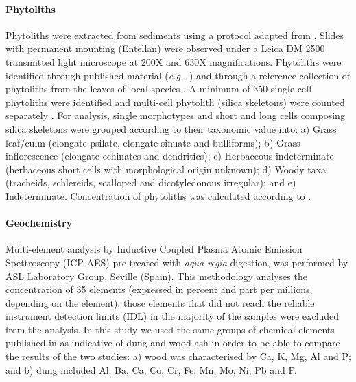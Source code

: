 \documentclass[authoryear,preprint,review,12pt]{elsarticle}
\begin{document}
\paragraph{Phytoliths}
Phytoliths were extracted from sediments using a protocol adapted from \citet{Madella1998}. Slides with permanent mounting (Entellan\textregistered) were observed under a Leica DM 2500 transmitted light microscope at 200X and 630X magnifications. Phytoliths were identified through published material (\emph{e.g.}, \citealp{Pearsall2008a,Piperno2006}) and through a reference collection of phytoliths from the leaves of local species \citep{Lancelotti2010}. A minimum of 350 single-cell phytoliths were identified and multi-cell phytolith (silica skeletons) were counted separately \citep{Veen1982,Zurro2010}. For analysis, single morphotypes and short and long cells composing silica skeletons were grouped according to their taxonomic value into: a) Grass leaf/culm (elongate psilate, elongate sinuate and bulliforms); b) Grass inflorescence (elongate echinates and dendritics); c) Herbaceous indeterminate (herbaceous short cells with morphological origin unknown); d) Woody taxa (tracheids, schlereids, scalloped and dicotyledonous irregular); and e) Indeterminate. Concentration of phytoliths was calculated according to \citet{Albert2001}.
\paragraph{Geochemistry}
Multi-element analysis by Inductive Coupled Plasma Atomic Emission Spettroscopy (ICP-AES) pre-treated with \textit{aqua regia} digestion, was performed by ASL Laboratory Group, Seville (Spain). This methodology analyses the concentration of 35 elements (expressed in percent and part per millions, depending on the element); those elements that did not reach the reliable instrument detection limits (IDL) in the majority of the samples were excluded from the analysis. In this study we used the same groups of chemical elements published in \citet{Rondelli2014} as indicative of dung and wood ash in order to be able to compare the results of the two studies: a) wood was characterised by Ca, K, Mg, Al and P; and b) dung included Al, Ba, Ca, Co, Cr, Fe, Mn, Mo, Ni, Pb and P.
\end{document}
